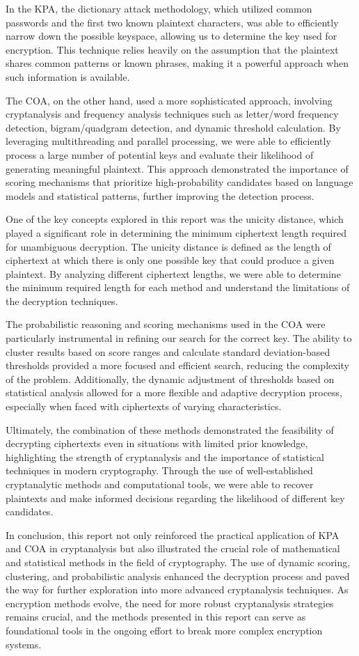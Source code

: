 \documentclass{article}
\begin{document}
In the KPA, the dictionary attack methodology, which utilized common passwords and the first two known plaintext characters, was able to efficiently narrow down the possible keyspace, allowing us to determine the key used for encryption. This technique relies heavily on the assumption that the plaintext shares common patterns or known phrases, making it a powerful approach when such information is available.

The COA, on the other hand, used a more sophisticated approach, involving cryptanalysis and frequency analysis techniques such as letter/word frequency detection, bigram/quadgram detection, and dynamic threshold calculation. By leveraging multithreading and parallel processing, we were able to efficiently process a large number of potential keys and evaluate their likelihood of generating meaningful plaintext. This approach demonstrated the importance of scoring mechanisms that prioritize high-probability candidates based on language models and statistical patterns, further improving the detection process.

One of the key concepts explored in this report was the unicity distance, which played a significant role in determining the minimum ciphertext length required for unambiguous decryption. The unicity distance is defined as the length of ciphertext at which there is only one possible key that could produce a given plaintext. By analyzing different ciphertext lengths, we were able to determine the minimum required length for each method and understand the limitations of the decryption techniques.

The probabilistic reasoning and scoring mechanisms used in the COA were particularly instrumental in refining our search for the correct key. The ability to cluster results based on score ranges and calculate standard deviation-based thresholds provided a more focused and efficient search, reducing the complexity of the problem. Additionally, the dynamic adjustment of thresholds based on statistical analysis allowed for a more flexible and adaptive decryption process, especially when faced with ciphertexts of varying characteristics.

Ultimately, the combination of these methods demonstrated the feasibility of decrypting ciphertexts even in situations with limited prior knowledge, highlighting the strength of cryptanalysis and the importance of statistical techniques in modern cryptography. Through the use of well-established cryptanalytic methods and computational tools, we were able to recover plaintexts and make informed decisions regarding the likelihood of different key candidates.

In conclusion, this report not only reinforced the practical application of KPA and COA in cryptanalysis but also illustrated the crucial role of mathematical and statistical methods in the field of cryptography. The use of dynamic scoring, clustering, and probabilistic analysis enhanced the decryption process and paved the way for further exploration into more advanced cryptanalysis techniques. As encryption methods evolve, the need for more robust cryptanalysis strategies remains crucial, and the methods presented in this report can serve as foundational tools in the ongoing effort to break more complex encryption systems.
\end{document}
